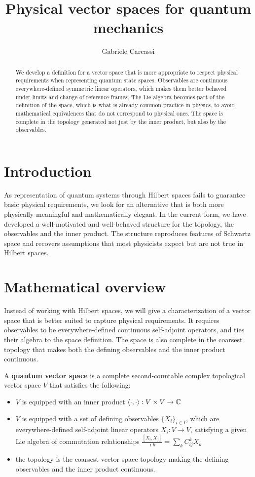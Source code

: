 \documentclass{techbrief}
\title{Physical vector spaces for quantum mechanics}
\author{Gabriele Carcassi}
\begin{document}
	
\maketitle
	
\begin{abstract}
	We develop a definition for a vector space that is more appropriate to respect physical requirements when representing quantum state spaces. Observables are continuous everywhere-defined symmetric linear operators, which makes them better behaved under limits and change of reference frames. The Lie algebra becomes part of the definition of the space, which is what is already common practice in physics, to avoid mathematical equivalences that do not correspond to physical ones. The space is complete in the topology generated not just by the inner product, but also by the observables.
\end{abstract}

\section{Introduction}

As representation of quantum systems through Hilbert spaces fails to guarantee basic physical requirements, we look for an alternative that is both more physically meaningful and mathematically elegant. In the current form, we have developed a well-motivated and well-behaved structure for the topology, the observables and the inner product. The structure reproduces features of Schwartz space and recovers assumptions that most physicists expect but are not true in Hilbert spaces.

\section{Mathematical overview}

Instead of working with Hilbert spaces, we will give a characterization of a vector space that is better suited to capture physical requirements. It requires observables to be everywhere-defined continuous self-adjoint operators, and ties their algebra to the space definition. The space is also complete in the coarsest topology that makes both the defining observables and the inner product continuous.

\begin{defn}
	A \textbf{quantum vector space} is a complete second-countable complex topological vector space $V$ that satisfies the following:
	\begin{itemize}
		\item $V$ is equipped with an inner product $\langle \cdot , \cdot \rangle : V \times V \to \mathbb{C}$
		\item $V$ is equipped with a set of defining observables $\{X_i\}_{i \in I}$, which are everywhere-defined self-adjoint linear operators $X_i : V \to V$, satisfying a given Lie algebra of commutation relationships $\frac{[X_i, X_j]}{\imath \hbar} = \sum\limits_k C_{ij}^k X_k$
		\item the topology is the coarsest vector space topology making the defining observables and the inner product continuous.
	\end{itemize}
\end{defn}
\end{document}
